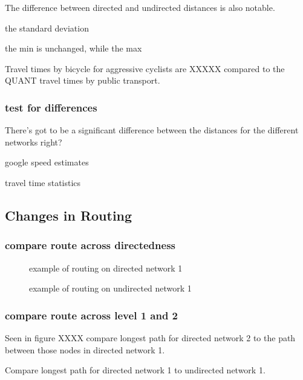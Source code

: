 The difference between directed and undirected distances is also notable. 

the standard deviation 

the min is unchanged, while the max 

Travel times by bicycle for aggressive cyclists are XXXXX compared to the QUANT travel times by public transport. 

\subsubsection{test for differences}

There's got to be a significant difference between the distances for the different networks right?


\begin{table}
\centering
\caption{google speed estimates}
\label{table:google_speeds}
\end{table}


\begin{table}
\centering
\caption{travel time statistics}
\label{table:travel_time_stats}
\end{table}

\subsection{Changes in Routing}


\subsubsection{compare route across directedness}
\begin{figure}
\centering
\caption{example of routing on directed network 1}
\label{fig:routing_1}
\end{figure}

\begin{figure}
\centering
\caption{example of routing on undirected network 1}
\label{fig:routing_1}
\end{figure}

\subsubsection{compare route across level 1 and 2}

Seen in figure XXXX  compare longest path for directed network 2 to the path between those nodes in directed network 1. 

Compare longest path for directed network 1 to undirected network 1. 

